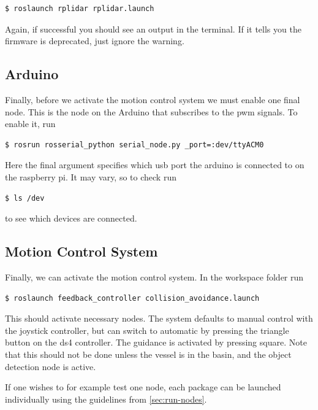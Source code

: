 \begin{lstlisting}[language=bash]
$ roslaunch rplidar rplidar.launch 
\end{lstlisting}

Again, if successful you should see an output in the terminal. If it tells you the firmware is deprecated, just ignore the warning. 

\subsection{Arduino}

Finally, before we activate the motion control system we must enable one final node. This is the node on the Arduino that subscribes to the pwm signals. To enable it, run 

\begin{lstlisting}[language=bash]
$ rosrun rosserial_python serial_node.py _port=:dev/ttyACM0
\end{lstlisting}

Here the final argument specifies which usb port the arduino is connected to on the raspberry pi. It may vary, so to check run 

\begin{lstlisting}[language=bash]
$ ls /dev
\end{lstlisting}

to see which devices are connected. 

\subsection{Motion Control System}

Finally, we can activate the motion control system. In the workspace folder run 

\begin{lstlisting}[language=bash]
$ roslaunch feedback_controller collision_avoidance.launch
\end{lstlisting}

This should activate necessary nodes. The system defaults to manual control with the joystick controller, but can switch to automatic by pressing the triangle button on the ds4 controller. The guidance is activated by pressing square. Note that this should not be done unless the vessel is in the basin, and the object detection node is active. 

If one wishes to for example test one node, each package can be launched individually using the guidelines from \cref{sec:run-nodes}.

